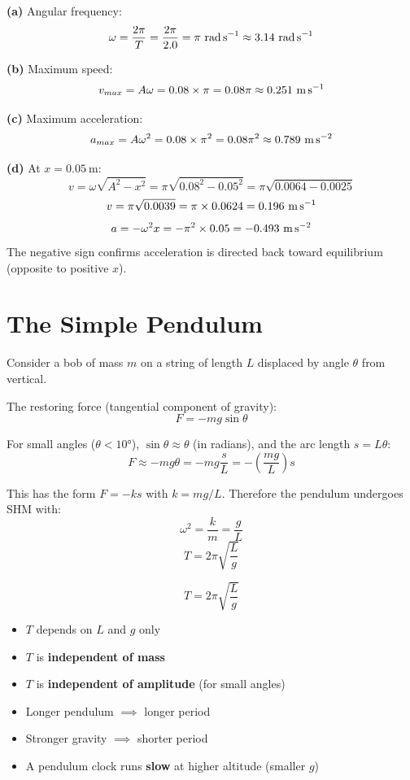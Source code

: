\begin{solutionbox}
\textbf{(a)} Angular frequency:
\[
  \omega = \frac{2\pi}{T} = \frac{2\pi}{2.0}
  = \pi\ \text{rad\,s}^{-1} \approx 3.14\ \text{rad\,s}^{-1}
\]

\textbf{(b)} Maximum speed:
\[
  v_{max} = A\omega = 0.08 \times \pi
  = 0.08\pi \approx 0.251\ \text{m\,s}^{-1}
\]

\textbf{(c)} Maximum acceleration:
\[
  a_{max} = A\omega^2 = 0.08 \times \pi^2
  = 0.08\pi^2 \approx 0.789\ \text{m\,s}^{-2}
\]

\textbf{(d)} At $x = 0.05\ \text{m}$:
\[
  v = \omega\sqrt{A^2-x^2}
  = \pi\sqrt{0.08^2-0.05^2}
  = \pi\sqrt{0.0064-0.0025}
\]
\[
  v = \pi\sqrt{0.0039}
  = \pi \times 0.0624
  = 0.196\ \text{m\,s}^{-1}
\]
\[
  a = -\omega^2 x = -\pi^2 \times 0.05
  = -0.493\ \text{m\,s}^{-2}
\]
The negative sign confirms acceleration is directed
back toward equilibrium (opposite to positive $x$).
\end{solutionbox}

\section{The Simple Pendulum}

\begin{processbox}
Consider a bob of mass $m$ on a string of length $L$
displaced by angle $\theta$ from vertical.

The restoring force (tangential component of gravity):
\[
  F = -mg\sin\theta
\]

For small angles ($\theta < 10°$), $\sin\theta \approx \theta$
(in radians), and the arc length $s = L\theta$:
\[
  F \approx -mg\theta = -mg\frac{s}{L}
  = -\left(\frac{mg}{L}\right)s
\]

This has the form $F = -ks$ with $k = mg/L$. Therefore
the pendulum undergoes SHM with:
\[
  \omega^2 = \frac{k}{m} = \frac{g}{L}
\]
\[
  \boxed{T = 2\pi\sqrt{\frac{L}{g}}}
\]
\end{processbox}

\begin{keybox}
\[
  T = 2\pi\sqrt{\frac{L}{g}}
\]
\begin{itemize}[noitemsep]
  \item $T$ depends on $L$ and $g$ only
  \item $T$ is \textbf{independent of mass}
  \item $T$ is \textbf{independent of amplitude}
  (for small angles)
  \item Longer pendulum $\implies$ longer period
  \item Stronger gravity $\implies$ shorter period
  \item A pendulum clock runs \textbf{slow} at higher
  altitude (smaller $g$)
\end{itemize}
\end{keybox}

